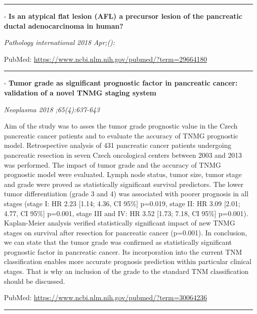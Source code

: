 \documentclass[]{article}
\begin{document}
\begin{center}\rule{0.5\linewidth}{\linethickness}\end{center}

 - \textbf{Is an atypical flat lesion (AFL) a precursor lesion of the
pancreatic ductal adenocarcinoma in human?}

\emph{Pathology international 2018 Apr;():}

PubMed: \url{https://www.ncbi.nlm.nih.gov/pubmed/?term=29664180}

{}

{}

\begin{center}\rule{0.5\linewidth}{\linethickness}\end{center}

 - \textbf{Tumor grade as significant prognostic factor in pancreatic
cancer: validation of a novel TNMG staging system}

\emph{Neoplasma 2018 ;65(4):637-643}

Aim of the study was to asses the tumor grade prognostic value in the
Czech pancreatic cancer patients and to evaluate the accuracy of TNMG
prognostic model. Retrospective analysis of 431 pancreatic cancer
patients undergoing pancreatic resection in seven Czech oncological
centers between 2003 and 2013 was performed. The impact of tumor grade
and the accuracy of TNMG prognostic model were evaluated. Lymph node
status, tumor size, tumor stage and grade were proved as statistically
significant survival predictors. The lower tumor differentiation (grade
3 and 4) was associated with poorer prognosis in all stages (stage I: HR
2.23 {[}1.14; 4.36, CI 95\%{]} p=0.019, stage II: HR 3.09 {[}2.01; 4.77,
CI 95\%{]} p=0.001, stage III and IV: HR 3.52 {[}1.73; 7.18, CI 95\%{]}
p=0.001). Kaplan-Meier analysis verified statistically significant
impact of new TNMG stages on survival after resection for pancreatic
cancer (p=0.001). In conclusion, we can state that the tumor grade was
confirmed as statistically significant prognostic factor in pancreatic
cancer. Its incorporation into the current TNM classification enables
more accurate prognosis prediction within particular clinical stages.
That is why an inclusion of the grade to the standard TNM classification
should be discussed.

PubMed: \url{https://www.ncbi.nlm.nih.gov/pubmed/?term=30064236}

{}

{}

\begin{center}\rule{0.5\linewidth}{\linethickness}\end{center}
\end{document}
